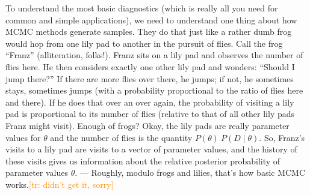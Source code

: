 \documentclass[nobib]{tufte-handout}
\newcommand{\tr}[1]{\textcolor{DarkOrange}{[tr: #1]}}
\begin{document}
\begin{InfoBox}[]
{\begin{minipage}{1.5\textwidth}
    To understand the most basic diagnostics (which is really all you need for common and
    simple applications), we need to understand one thing about how MCMC methods generate
    samples. They do that just like a rather dumb frog would hop from one lily pad to another
    in the pursuit of flies. Call the frog ``Franz'' (alliteration, folks!). Franz sits on a
    lily pad and observes the number of flies here. He then considers exactly one other lily
    pad and wonders: ``Should I jump there?'' If there are more flies over there, he jumps; if
    not, he sometimes stays, sometimes jumps (with a probability proportional to the ratio of
    flies here and there). If he does that over an over again, the probability of visiting a
    lily pad is proportional to its number of flies (relative to that of all other lily pads
    Franz might visit). Enough of frogs? Okay, the lily pads are really parameter values for
    $\theta$ and the number of flies is the quantity $P(\theta) \ P(D \mid \theta)$. So,
    Franz's visits to a lily pad are visits to a vector of parameter values, and
    the history of these visits gives us information about the relative posterior probability
    of parameter values $\theta$. --- Roughly, modulo frogs and lilies, that's how basic MCMC
    works.\tr{didn't get it, sorry}


\end{minipage}}
\end{InfoBox}
\end{document}
